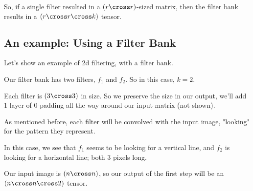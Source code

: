         So, if a single filter resulted in a $(r \cross r)$-sized matrix, then the filter bank results in a $(r \cross r \cross k)$ tensor.
    
    \subsection{An example: Using a Filter Bank}

        Let's show an example of 2d filtering, with a filter bank.
        
        Our filter bank has two filters, $f_1$ and $f_2$. So in this case, $k=2$.
        
        Each filter is $(3 \cross 3)$ in size. So we preserve the size in our output, we'll add 1 layer of 0-padding all the way around our input matrix (not shown).
        
        As mentioned before, each filter will be convolved with the input image, "looking" for the pattern they represent.
        
        In this case, we see that $f_1$ seems to be looking for a vertical line, and $f_2$ is looking for a horizontal line; both 3 pixels long.
        
        Our input image is $(n \cross n)$, so our output of the first step will be an $(n \cross n \cross 2)$ tensor.
        
